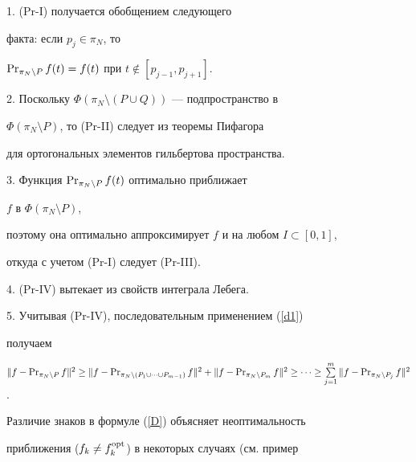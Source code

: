 \vspace*{-2mm}





\begin{pf}


1. (Pr-I) получается обобщением следующего


факта: если $p_j\in\pi_N$, то 


$\operatorname{Pr}_{\pi_N\setminus P}f(t)=f(t)$ при $t\notin[p_{j-1},p_{j+1}]$.





2. Поскольку $\Phi(\pi_N\setminus (P\cup Q))$ --- подпространство в


$\Phi(\pi_N\setminus P)$, то (Pr-II) следует из теоремы Пифагора


для ортогональных элементов гильбертова пространства.





3. Функция $\operatorname{Pr}_{\pi_N\setminus P}f(t)$ оптимально приближает


$f$ в $\Phi(\pi_N\setminus P)$,


поэтому она оптимально аппроксимирует $f$ и на любом $I \subset[0,1]$,


откуда с учетом (Pr-I) следует (Pr-III).





4. (Pr-IV) вытекает из свойств интеграла Лебега.





5. Учитывая (Pr-IV), последовательным применением (\ref{d1})


получаем


$\|f-\PR_{\pi_N\setminus P}f\|^2\geq


\|f-\PR_{\pi_N\setminus (P_1\cup \dotsb \cup P_{m-1})}f\|^2+


\|f-\PR_{\pi_N\setminus P_m}f\|^2\geq \dotsb \geq


\sum\limits_{j=1}^m \|f-\PR_{\pi_N\setminus P_j}f\|^2$.


\end{pf}








Различие знаков в формуле (\ref{D}) объясняет неоптимальность


приближения ($f_k\neq f_k^{\operatorname{opt}}$) в некоторых случаях (см. пример


